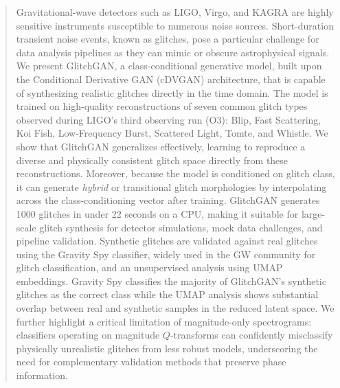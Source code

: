 \documentclass[reprint,nofootinbib,amsmath,amssymb,aps,floatfix]{revtex4-2}
\begin{document}
\begin{abstract}
Gravitational-wave detectors such as LIGO, Virgo, and KAGRA are highly sensitive instruments susceptible to numerous noise sources. 
Short-duration transient noise events, known as glitches, pose a particular challenge for data analysis pipelines as they can mimic or obscure astrophysical signals. 
We present GlitchGAN, a class-conditional generative model, built upon the Conditional Derivative GAN (cDVGAN) architecture, that is capable of synthesizing realistic glitches directly in the time domain. 
The model is trained on high-quality reconstructions of seven common glitch types observed during LIGO's third observing run (O3): Blip, Fast Scattering, Koi Fish, Low-Frequency Burst, Scattered Light, Tomte, and Whistle.
We show that GlitchGAN generalizes effectively, learning to reproduce a diverse and physically consistent glitch space directly from these reconstructions. 
Moreover, because the model is conditioned on glitch class, it can generate \textit{hybrid} or transitional glitch morphologies by interpolating across the class-conditioning vector after training.
GlitchGAN generates 1000 glitches in under 22 seconds on a CPU, making it suitable for large-scale glitch synthesis for detector simulations, mock data challenges, and pipeline validation.
Synthetic glitches are validated against real glitches using the Gravity Spy classifier, widely used in the GW community for glitch classification, and an unsupervised analysis using UMAP embeddings.
Gravity Spy classifies the majority of GlitchGAN's synthetic glitches as the correct class while the UMAP analysis shows substantial overlap between real and synthetic samples in the reduced latent space. 
We further highlight a critical limitation of magnitude-only spectrograms: classifiers operating on magnitude $Q$-transforms can confidently misclassify physically unrealistic glitches from less robust models, underscoring the need for complementary validation methods that preserve phase information.
\end{abstract}
\end{document}
